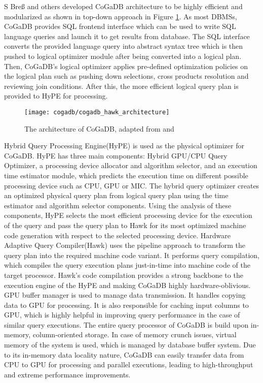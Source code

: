 S Bre{ß} and others developed CoGaDB architecture to be highly efficient and modularized as shown in top-down approach in Figure \ref{fig:cogadbarch}. As most DBMSs, CoGaDB provides SQL frontend interface which can be used to write SQL language queries and launch it to get results from database. The SQL interface converts the provided language query into abstract syntax tree which is then pushed to logical optimizer module after being converted into a logical plan. Then, CoGaDB's logical optimizer applies pre-defined optimization policies on the logical plan such as pushing down selections, cross products resolution and reviewing join conditions. After this, the more efficient logical query plan is provided to HyPE for processing.
\begin{figure}
\texttt{[image: cogadb/cogadb\_hawk\_architecture]}
\caption{The architecture of CoGaDB, adapted from \cite{cogadb_hawk} and \cite{cogadb_manual}}
\label{fig:cogadbarch}
\end{figure}
\newline
Hybrid Query Processing Engine(HyPE)\cite{cogadb_hype} is used as the physical optimizer for CoGaDB. HyPE has three main components: Hybrid GPU/CPU Query Optimizer, a processing device allocator and algorithm selector, and an execution time estimator module, which predicts the execution time on different possible processing device such as CPU, GPU or MIC. The hybrid query optimizer creates an optimized physical query plan from logical query plan using the time estimator and algorithm selector components\cite{cogadb_manual}. Using the analysis of these components, HyPE selects the most efficient processing device for the execution of the query and pass the query plan to Hawk for its most optimized machine code generation with respect to the selected processing device.
\newline
Hardware Adaptive Query Compiler(Hawk) uses the pipeline approach to transform the query plan into the required machine code variant. It performs query compilation, which compiles the query execution plans just-in-time into machine code of the target processor\cite{cogadb_hawk}. Hawk's code compilation provides a strong backbone to the execution engine of the HyPE and making CoGaDB highly hardware-oblivious.
\newline
GPU buffer manager is used to manage data transmission. It handles copying data to GPU for processing. It is also responsible for caching input columns to GPU, which is highly helpful in improving query performance in the case of similar query executions.
\newline
The entire query processor of CoGaDB is build upon in-memory, column-oriented storage. In case of memory crunch issues, virtual memory of the system is used, which is managed by database buffer system. Due to its in-memory data locality nature, CoGaDB can easily transfer data from CPU to GPU for processing and parallel executions, leading to high-throughput and extreme performance improvements. 